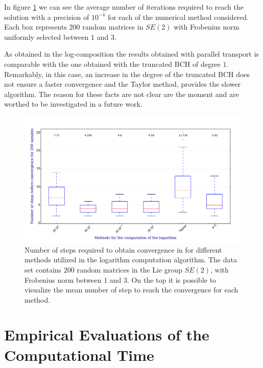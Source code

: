 In figure \ref{fig:log_computation_boxplot} we can see the average number of iterations required to reach the solution with a precision of $10^{-4}$ for each of the numerical method considered. Each box represents $200$ random matrices in $SE(2)$ with Frobenius norm uniformly selected between $1$ and $3$.

As obtained in the log-composition the results obtained with parallel transport is comparable with the one obtained with the truncated BCH of degree $1$. Remarkably, in this case, an increase in the degree of the truncated BCH does not ensure a faster convergence and the Taylor method, provides the slower algorithm. The reason for these facts are not clear are the moment and are worthed to be investigated in a future work.

\begin{figure}[!ht]
	\hspace{-0.5cm}
	\includegraphics[scale=0.5]{figures/log_computation_boxplot.pdf}
	\caption{Number of steps required to obtain convergence in for different methods utilized in the logarithm computation algorithm. The data set contains $200$ random matrices in the Lie group $SE(2)$, with Frobenius norm between $1$ and $3$. On the top it is possible to visualize the mean number of step to reach the convergence for each method.}
	\label{fig:log_computation_boxplot}
\end{figure}


\section{Empirical Evaluations of the Computational Time}

